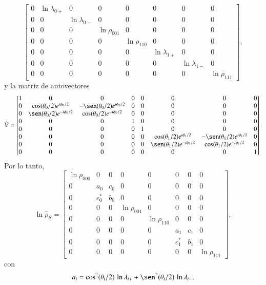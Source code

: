 \begin{appendixs}
\[\begin{bmatrix}
    0 & \ln \lambda_{0+} & 0 & 0 & 0 & 0 & 0 & 0 \\
    0 & 0 & \ln \lambda_{0-} & 0 & 0 & 0 & 0 & 0 \\
    0 & 0 & 0 & \ln \rho_{001} & 0 & 0 & 0 & 0 \\
    0 & 0 & 0 & 0 & \ln \rho_{110} & 0 & 0 & 0 \\
    0 & 0 & 0 & 0 & 0 & \ln \lambda_{1+} & 0 & 0 \\
    0 & 0 & 0 & 0 & 0 & 0 & \ln \lambda_{1-} & 0 \\
    0 & 0 & 0 & 0 & 0 & 0 & 0 & \ln \rho_{111}
\end{bmatrix},
\]
y la matriz de autovectores
\[
\hat{V} =
\begin{bmatrix}
    1 & 0 & 0 & 0 & 0 & 0 & 0 & 0 \\
    0 & \cos(\theta_{0}/2)e^{i\phi_{0}/2} & -\sen(\theta_{0}/2)e^{i\phi_{0}/2} & 0 & 0 & 0 & 0 & 0 \\
    0 & \sen(\theta_{0}/2)e^{-i\phi_{0}/2} & \cos(\theta_{0}/2)e^{-i\phi_{0}/2} & 0 & 0 & 0 & 0 & 0 \\
    0 & 0 & 0 & 1 & 0 & 0 & 0 & 0 \\
    0 & 0 & 0 & 0 & 1 & 0 & 0 & 0 \\
    0 & 0 & 0 & 0 & 0 &  \cos(\theta_{1}/2)e^{i\phi_{1}/2} & -\sen(\theta_{1}/2)e^{i\phi_{1}/2} & 0 \\
    0 & 0 & 0 & 0 & 0 & \sen(\theta_{1}/2)e^{-i\phi_{1}/2} & \cos(\theta_{1}/2)e^{-i\phi_{1}/2} & 0 \\
    0 & 0 & 0 & 0 & 0 & 0 & 0 & 1
\end{bmatrix}.
\]
Por lo tanto,
\[
\ln \hat{\rho}_{S} =
\begin{bmatrix}
    \ln \rho_{000} & 0 & 0 & 0 & 0 & 0 & 0 & 0 \\
    0 & a_{0} & c_{0} & 0 & 0 & 0 & 0 & 0 \\
    0 & c^{*}_{0} & b_{0} & 0 & 0 & 0 & 0 & 0 \\
    0 & 0 & 0 & \ln \rho_{001} & 0 & 0 & 0 & 0 \\
    0 & 0 & 0 & 0 & \ln \rho_{110} & 0 & 0 & 0 \\
    0 & 0 & 0 & 0 & 0 & a_{1} & c_{1} & 0 \\
    0 & 0 & 0 & 0 & 0 & c^{*}_{1} & b_{1} & 0 \\
    0 & 0 & 0 & 0 & 0 & 0 & 0 & \ln \rho_{111}
\end{bmatrix},
\]
con
\begin{align*}
    a_{i} & = \cos^{2}(\theta_{i}/2)\,\ln \lambda_{i+} + \sen^{2}(\theta_{i}/2)\,\ln \lambda_{i-}, \\

\end{align*}
\end{appendixs}
